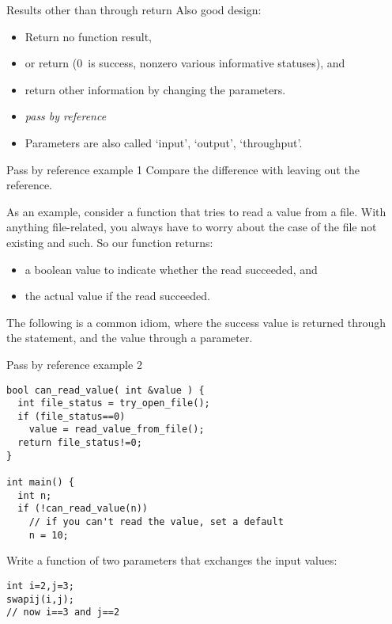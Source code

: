 \begin{slide}{Results other than through return}
  \label{sl:func-err-return}
  Also good design:
  \begin{itemize}
  \item Return no function result,
  \item or return  (0~is success, nonzero various
    informative statuses), and
  \item return other information by changing the parameters.
  \item \emph{pass by reference}
  \item Parameters are also called `input', `output', `throughput'.
  \end{itemize}
\end{slide}

\begin{block}{Pass by reference example 1}
  \label{sl:pass-reference1}
  Compare the difference with leaving out the reference.
\end{block}

As an example, consider a function that tries to read a value from a
file. With anything file-related, you always have to worry about the
case of the file not existing and such. So our function returns:
\begin{itemize}
\item a boolean value to indicate whether the read succeeded, and
\item the actual value if the read succeeded.
\end{itemize}
The following is a common idiom, where the success value is returned
through the  statement, and the value through a parameter.

\begin{block}{Pass by reference example 2}
  \label{sl:pass-reference2}
\begin{verbatim}
bool can_read_value( int &value ) {
  int file_status = try_open_file();
  if (file_status==0) 
    value = read_value_from_file();
  return file_status!=0;
}

int main() {
  int n;
  if (!can_read_value(n))
    // if you can't read the value, set a default
    n = 10;
\end{verbatim}
\end{block}

\begin{exercise}
  \label{ex:swap}
  Write a function  of two parameters that exchanges the input values:
\begin{verbatim}
int i=2,j=3;
swapij(i,j);
// now i==3 and j==2
\end{verbatim}
\end{exercise}

